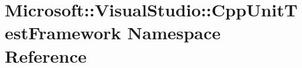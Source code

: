 \hypertarget{namespace_microsoft_1_1_visual_studio_1_1_cpp_unit_test_framework}{}\section{Microsoft\+:\+:Visual\+Studio\+:\+:Cpp\+Unit\+Test\+Framework Namespace Reference}
\label{namespace_microsoft_1_1_visual_studio_1_1_cpp_unit_test_framework}

